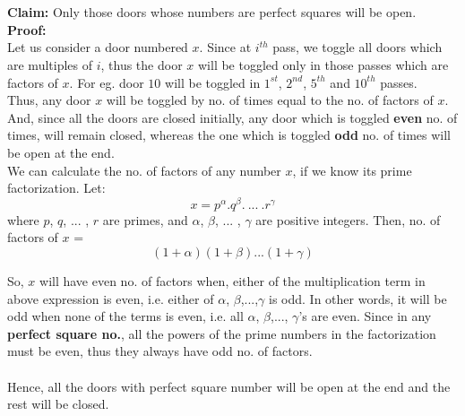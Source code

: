 \documentclass[12pt]{report}
\begin{document}
\\ \\
\textbf{Claim: } Only those doors whose numbers are perfect squares will be open.
\\
\textbf{Proof: } \\
Let us consider a door numbered $x$. Since at $i^{th}$ pass, we toggle all doors which are multiples of $i$, thus the door $x$ will be toggled only in those passes which are factors of $x$. For eg. door $10$ will be toggled in $1^{st}$, $2^{nd}$, $5^{th}$ and $10^{th}$ passes. 
\\ 
Thus, any door $x$ will be toggled by no. of times equal to the no. of factors of $x$. 
\\ 
And, since all the doors are closed initially, any door which is toggled \textbf{even} no. of times, will remain closed, whereas the one which is toggled \textbf{odd} no. of times will be open at the end. 
\\
We can calculate the no. of factors of any number $x$, if we know its prime factorization. Let:
\[ x = p^{\alpha}.q^{\beta}.\ ...\ .r^{\gamma} \]
where $p$, $q$, ... , $r$ are primes, and $\alpha$, $\beta$, ... , $\gamma$ are positive integers. 
Then, no. of factors of $x$ = 
\[ (1 + \alpha)(1 + \beta)...(1 + \gamma) \]

So, $x$ will have even no. of factors when, either of the multiplication term in above expression is even, i.e. either of $\alpha$, $\beta$,...,$\gamma$ is odd. In other words, it will be odd when none of the terms is even, i.e. all $\alpha$, $\beta$,..., $\gamma$'s are even. 
Since in any \textbf{perfect square no.}, all the powers of the prime numbers in the factorization must be even, thus they always have odd no. of factors. 
\\ \\
Hence, all the doors with perfect square number will be open at the end and the rest will be closed. 
\end{document}
